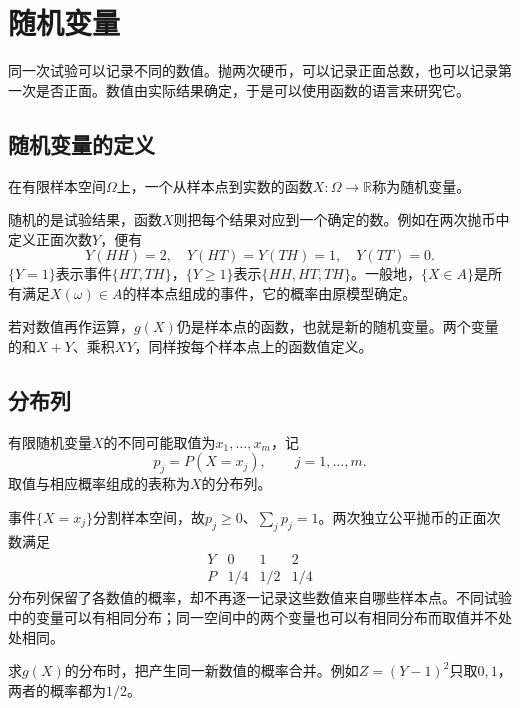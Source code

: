 \FloatBarrier
\newpage
\section{随机变量}
\label{sec:prob-random-variables}

同一次试验可以记录不同的数值。抛两次硬币，可以记录正面总数，也可以记录第一次是否正面。数值由实际结果确定，于是可以使用函数的语言来研究它。

\subsection{随机变量的定义}

\begin{definition}
在有限样本空间\(\Omega\)上，一个从样本点到实数的函数\(X:\Omega\to\mathbb R\)称为{\heiti 随机变量}。
\end{definition}

随机的是试验结果，函数\(X\)则把每个结果对应到一个确定的数。例如在两次抛币中定义正面次数\(Y\)，便有
\[
 Y(HH)=2,\quad Y(HT)=Y(TH)=1,\quad Y(TT)=0.
\]
\(\{Y=1\}\)表示事件\(\{HT,TH\}\)，\(\{Y\ge1\}\)表示\(\{HH,HT,TH\}\)。一般地，\(\{X\in A\}\)是所有满足\(X(\omega)\in A\)的样本点组成的事件，它的概率由原模型确定。

若对数值再作运算，\(g(X)\)仍是样本点的函数，也就是新的随机变量。两个变量的和\(X+Y\)、乘积\(XY\)，同样按每个样本点上的函数值定义。

\subsection{分布列}

\begin{definition}
有限随机变量\(X\)的不同可能取值为\(x_1,\ldots,x_m\)，记
\[
 p_j=P(X=x_j),\qquad j=1,\ldots,m.
\]
取值与相应概率组成的表称为\(X\)的{\heiti 分布列}。
\end{definition}

事件\(\{X=x_j\}\)分割样本空间，故\(p_j\ge0\)、\(\sum_jp_j=1\)。两次独立公平抛币的正面次数满足
\[
\begin{array}{c|ccc}
Y&0&1&2\\\hline
P&1/4&1/2&1/4
\end{array}
\]
分布列保留了各数值的概率，却不再逐一记录这些数值来自哪些样本点。不同试验中的变量可以有相同分布；同一空间中的两个变量也可以有相同分布而取值并不处处相同。

求\(g(X)\)的分布时，把产生同一新数值的概率合并。例如\(Z=(Y-1)^2\)只取\(0,1\)，两者的概率都为\(1/2\)。

